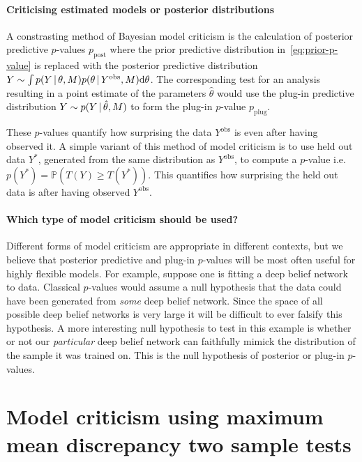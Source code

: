\documentclass{article} %
\def\ie{i.e.\ }
\begin{document}
\paragraph{Criticising estimated models or posterior distributions}

A constrasting method of Bayesian model criticism is the calculation of posterior predictive $p$-values $p_\textrm{post}$ \citep[e.g.][]{Guttman1967-my, Rubin1984-tw} where the prior predictive distribution in~\eqref{eq:prior-p-value} is replaced with the posterior predictive distribution ${Y \sim \int p(Y \,|\, \theta, M)p(\theta \,|\, Y^\textrm{obs}, M) \mathrm{d}\theta}$.
The corresponding test for an analysis resulting in a point estimate of the parameters $\hat\theta$ would use the plug-in predictive distribution ${Y \sim p(Y \,|\, \hat\theta, M)}$ to form the plug-in $p$-value $p_\textrm{plug}$.

These $p$-values quantify how surprising the data $Y^\textrm{obs}$ is even after having observed it.
A simple variant of this method of model criticism is to use held out data $Y^*$, generated from the same distribution as $Y^\textrm{obs}$, to compute a $p$-value \ie ${p(Y^*) = \mathbb{P}(T(Y)\geq T(Y^*))}$.
This quantifies how surprising the held out data is after having observed $Y^\textrm{obs}$.

\paragraph{Which type of model criticism should be used?}

Different forms of model criticism are appropriate in different contexts, but we believe that posterior predictive and plug-in $p$-values will be most often useful for highly flexible models.
For example, suppose one is fitting a deep belief network to data.
Classical $p$-values would assume a null hypothesis that the data could have been generated from \emph{some} deep belief network.
Since the space of all possible deep belief networks is very large it will be difficult to ever falsify this hypothesis.
A more interesting null hypothesis to test in this example is whether or not our \emph{particular} deep belief network can faithfully mimick the distribution of the sample it was trained on.
This is the null hypothesis of posterior or plug-in $p$-values.

\section{Model criticism using maximum mean discrepancy two sample tests}
\label{sec:model-crit-two-sample}
\end{document}
